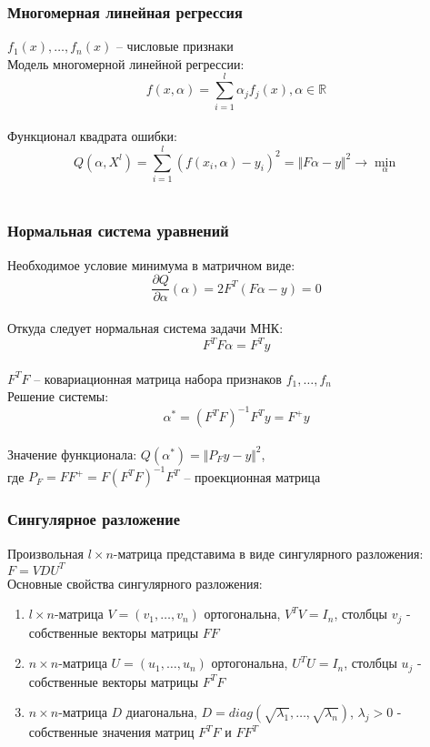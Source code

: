 \documentclass[12pt]{beamer}
\begin{document}
\begin{frame}\frametitle{Многомерная линейная регрессия}
$f_1(x), \dots, f_n(x)$ -- числовые признаки\\
Модель многомерной линейной регрессии:\\
$$f (x, \alpha) = \sum\limits_{i=1}^l \alpha_j f_j(x), \alpha \in \mathbb{R}$$\\
\vspace{5mm}
Функционал квадрата ошибки:\\
$$Q(\alpha,X^l) = \sum\limits_{i=1}^l (f (x_i, \alpha) - y_i)^2  = \Vert F\alpha - y \Vert^2 \rightarrow \min\limits_{\alpha}$$\\

\end{frame}

\begin{frame}\frametitle{Нормальная система уравнений}
Необходимое условие минимума в матричном виде:\\
$$\frac{\partial Q}{\partial \alpha} (\alpha) = 2 F^T(F \alpha - y) = 0$$\\
Откуда следует нормальная система задачи МНК:\\
$$F^TF\alpha = F^Ty$$\\
$F^TF$ -- ковариационная матрица набора признаков $f_1, \dots, f_n$\\
\vspace{5mm}
Решение системы:\\
$$\alpha^* = (F^TF)^{-1}F^Ty = F^+y$$\\
Значение функционала: $Q(\alpha^*) = \Vert P_F y - y \Vert^2$,\\
где $P_F = FF^+ = F(F^TF)^{-1}F^T$ -- проекционная матрица
\end{frame}

\begin{frame}\frametitle{Сингулярное разложение}
Произвольная $l \times n$-матрица представима в виде сингулярного разложения:\\
$F = VDU^T$\\
Основные свойства сингулярного разложения:\\
\begin{enumerate}[--]
\item $l \times n$-матрица $V = (v_1, \dots, v_n)$ ортогональна, $V^TV = I_n$, столбцы $v_j$ - собственные векторы матрицы $FF$
\item $n \times n$-матрица $U = (u_1, \dots, u_n)$ ортогональна, $U^TU = I_n$, столбцы $u_j$ - собственные векторы матрицы $F^TF$
\item $n \times n$-матрица $D$ диагональна, $D = diag (\sqrt{\lambda_1}, \dots, \sqrt{\lambda_n})$, $\lambda_j > 0$ - собственные значения матриц $F^TF$ и $FF^T$
\end{enumerate}
\end{frame}
\end{document}
